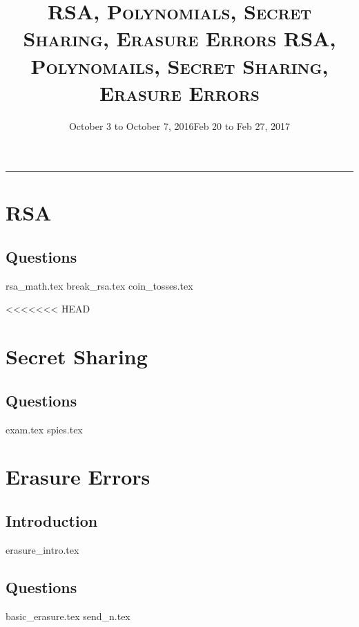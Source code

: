 \documentclass{exam}
\title{\textsc{RSA, Polynomials, Secret Sharing, Erasure Errors }}
\date{October 3 to October 7, 2016}
\title{\textsc{RSA, Polynomails, Secret Sharing, Erasure Errors}}
\date{Feb 20 to Feb 27, 2017}
\begin{document}
\maketitle
\rule{\textwidth}{0.15em}
\fontsize{12}{15}\selectfont
\thispagestyle{empty}

\section{RSA}
\subsection{Questions}
\begin{questions}
{rsa_math.tex}
{break_rsa.tex}
{coin_tosses.tex}
\end{questions}

<<<<<<< HEAD
\section{Secret Sharing}
\subsection{Questions}
\begin{questions}
	{exam.tex}
	{spies.tex}
\end{questions}

\section{Erasure Errors}
\subsection{Introduction}
{erasure_intro.tex}
\subsection{Questions}
\begin{questions}
{basic_erasure.tex}
{send_n.tex}
\end{questions}
\end{document}
